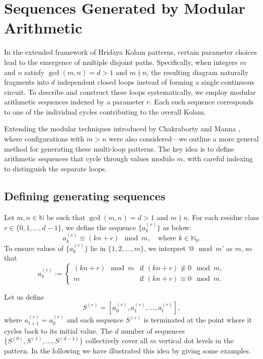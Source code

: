 \documentclass[12pt,a4paper]{article}
\theoremstyle{remark} %
\theoremstyle{example} %
\theoremstyle{proposition}
\begin{document}
\section{Sequences Generated by Modular Arithmetic}

\noindent
In the extended framework of Hridaya Kolam patterns, certain parameter choices lead to the emergence of multiple disjoint paths. Specifically, when integers \( m \) and \( n \) satisfy \( \gcd(m,n) = d > 1 \) and \( m \nmid n \), the resulting diagram naturally fragments into \( d \) independent closed loops instead of forming a single continuous circuit. To describe and construct these loops systematically, we employ modular arithmetic sequences indexed by a parameter \( r \). Each such sequence corresponds to one of the individual cycles contributing to the overall Kolam.
\medskip

\noindent
Extending the modular techniques introduced by Chakraborty and Manna \cite{CHAKMAN}, where configurations with \( m > n \) were also considered—we outline a more general method for generating these multi-loop patterns. The key idea is to define arithmetic sequences that cycle through values modulo \( m \), with careful indexing to distinguish the separate loops.

\subsection{Defining generating sequences}

\noindent
Let \( m, n \in \mathbb{N} \) be such that \( \gcd(m,n) = d > 1 \) and \( m \nmid n \). For each residue class \( r \in \{0, 1, \dotsc, d-1\} \), we define the sequence $\{a_k^{(r)}\}$ as below:
\[
a_k^{(r)} \equiv (kn + r) \mod m, \quad \text{where } k \in \mathbb{N}_0.
\]
To ensure values of $\{a_k^{(r)}\}$ lie in \( \{1, 2, \dotsc, m\} \), we interpret `\( 0 \mod m \)' as \( m \), so that
\[
a_k^{(r)} := \begin{cases}
(kn + r) \mod m & \text{if } (kn + r) \not\equiv 0 \mod m, \\
m & \text{if } (kn + r) \equiv 0 \mod m.
\end{cases}
\]

\noindent
Let us define
\[
S^{(r)} = [a_0^{(r)}, a_1^{(r)}, \dotsc, a_t^{(r)}],
\]
where $a_{t+1}^{(r)} = a_0^{(r)}$ and each sequence \( S^{(r)}\) is terminated at the point where it cycles back to its initial value. The \( d \) number of sequences \( \{S^{(0)}, S^{(1)}, \dotsc, S^{(d-1)}\} \) collectively cover all \( m \) vertical dot levels in the pattern. In the following we have illustrated this idea by giving some examples.
\end{document}
